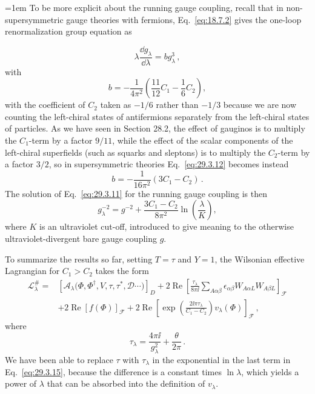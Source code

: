 \begingroup
\emergencystretch=1em
To be more explicit about the running gauge coupling, recall that in
non-super\-sym\-met\-ric gauge theories with fermions,
Eq.~\eqref{eq:18.7.2}
gives the one-loop renormalization group equation as
\par
\endgroup
\begin{equation}
  \lambda\frac{\dd g_\lambda}{\dd\lambda}=bg_\lambda^3\,,
  \tag{29.3.11}\label{eq:29.3.11}
\end{equation}
with
\begin{equation}
  b=-\frac{1}{4\pi^2}
  \left(\frac{11}{12}C_1-\frac16 C_2\right),
  \tag{29.3.12}\label{eq:29.3.12}
\end{equation}
with the coefficient of \(C_2\) taken as \(-1/6\) rather than \(-1/3\)
because we are now counting the left-chiral states of antifermions
separately from the left-chiral states of particles. As we have seen in
Section 28.2, the effect of gauginos is to multiply the \(C_1\)-term by a
factor \(9/11\), while the effect of the scalar components of the
left-chiral superfields (such as squarks and sleptons) is to multiply the
\(C_2\)-term by a factor \(3/2\), so in supersymmetric theories
Eq.~\eqref{eq:29.3.12} becomes instead
\begin{equation}
  b=-\frac{1}{16\pi^2}(3C_1-C_2)\,.
  \tag{29.3.13}\label{eq:29.3.13}
\end{equation}
The solution of Eq.~\eqref{eq:29.3.11} for the running gauge coupling is
then
\begin{equation}
  g_\lambda^{-2}
  =
  g^{-2}
  +\frac{3C_1-C_2}{8\pi^2}\ln\left(\frac{\lambda}{K}\right),
  \tag{29.3.14}\label{eq:29.3.14}
\end{equation}
where \(K\) is an ultraviolet cut-off, introduced to give meaning to the
otherwise ultraviolet-divergent bare gauge coupling \(g\).

To summarize the results so far, setting \(T=\tau\) and \(Y=1\), the
Wilsonian effective Lagrangian for \(C_1>C_2\) takes the form
\begin{equation}
  \begin{aligned}
  \mathcal{L}^{\#}_\lambda
  ={}&
  \left[
    \mathcal{A}_\lambda
    \bigl(\Phi,\Phi^\dagger,V,\tau,\tau^*,\mathcal{D}\cdots\bigr)
  \right]_D
  +2\operatorname{Re}
  \left[
    \frac{\tau_\lambda}{8\pi \ii}
    \sum_{A\alpha\beta}
    \epsilon_{\alpha\beta}W_{A\alpha L}W_{A\beta L}
  \right]_{\mathcal{F}}
  \\
  &+2\operatorname{Re}\left[f(\Phi)\right]_{\mathcal{F}}
  +2\operatorname{Re}\left[
    \exp\left(\frac{2\ii\pi\tau_\lambda}{C_1-C_2}\right)
    v_\lambda(\Phi)
  \right]_{\mathcal{F}}\,,
  \end{aligned}
  \tag{29.3.15}\label{eq:29.3.15}
\end{equation}
where
\begin{equation}
  \tau_\lambda=\frac{4\pi \ii}{g_\lambda^2}+\frac{\theta}{2\pi}\,.
  \tag{29.3.16}\label{eq:29.3.16}
\end{equation}
We have been able to replace \(\tau\) with \(\tau_\lambda\) in the
exponential in the last term in Eq.~\eqref{eq:29.3.15}, because the
difference is a constant times \(\ln\lambda\), which yields a power of
\(\lambda\) that can be absorbed into the definition of \(v_\lambda\).

